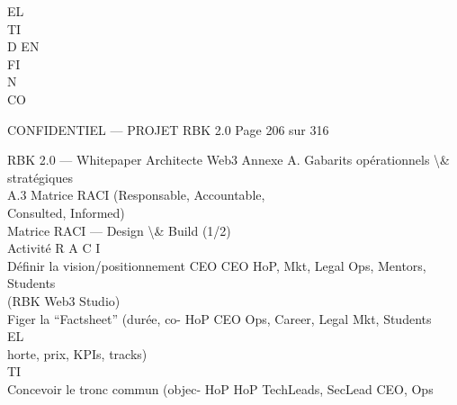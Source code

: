 \documentclass[12pt,landscape,a4paper]{article}
\newenvironment{confidential}
{\begin{tcolorbox}[
    colback=rbkred!5!white,
    colframe=rbkred!75!black,
    title=CONFIDENTIEL,
    fonttitle=\bfseries\color{white},
    coltitle=rbkred!75!black,
    breakable,
    enhanced,
    frame hidden,
    borderline west={2pt}{0pt}{rbkred!75!black}
]}
{\end{tcolorbox}}
\begin{document}
\vspace{0.5em}
EL\\
TI\\
D  EN\\
FI\\
N\\
CO\\
\vspace{0.5em}
\vspace{0.5em}
\vspace{0.5em}
\vspace{0.5em}
\begin{confidential}CONFIDENTIEL — PROJET RBK 2.0                                 Page 206 sur 316\end{confidential}
RBK 2.0 — Whitepaper Architecte Web3                                                    Annexe A. Gabarits opérationnels \textbackslash{}& stratégiques\\
\vspace{0.5em}
\vspace{0.5em}
\vspace{0.5em}
A.3     Matrice RACI (Responsable, Accountable,\\
Consulted, Informed)\\
Matrice RACI — Design \textbackslash{}& Build (1/2)\\
\vspace{0.5em}
\vspace{0.5em}
Activité                             R                A                C                           I\\
Définir la vision/positionnement     CEO              CEO              HoP, Mkt, Legal             Ops, Mentors, Students\\
(RBK Web3 Studio)\\
Figer la “Factsheet” (durée, co-     HoP              CEO              Ops, Career, Legal          Mkt, Students\\
\vspace{0.5em}
\vspace{0.5em}
\vspace{0.5em}
\vspace{0.5em}
EL\\
horte, prix, KPIs, tracks)\\
\vspace{0.5em}
\vspace{0.5em}
\vspace{0.5em}
\vspace{0.5em}
TI\\
Concevoir le tronc commun (objec- HoP                 HoP              TechLeads, SecLead          CEO, Ops\\
\end{document}
